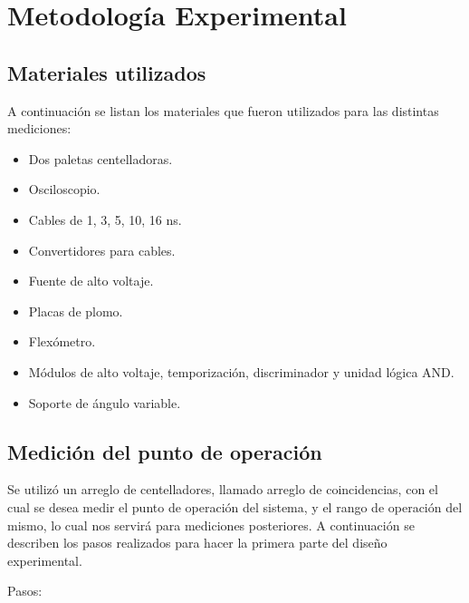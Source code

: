 \documentclass[a4paper,10pt]{article}
\numberwithin{equation}{section}
\begin{document}
\newpage

\section{Metodología Experimental}
\label{s:metodologiaexperimental}

\subsection{Materiales utilizados}
\label{ss:materialesutilizados}

A continuación se listan los materiales que fueron utilizados para las distintas mediciones:

\begin{itemize}
 \item Dos paletas centelladoras.
 \item Osciloscopio.
 \item Cables de 1, 3, 5, 10, 16 ns.
 \item Convertidores para cables.
 \item Fuente de alto voltaje.
 \item Placas de plomo.
 \item Flexómetro.
 \item Módulos de alto voltaje, temporización, discriminador y unidad lógica AND.
 \item Soporte de ángulo variable.
\end{itemize}


\subsection{Medición del punto de operación}
\label{ss:medicionoperacion}

Se utilizó un arreglo de centelladores, llamado arreglo de coincidencias, con el cual se desea medir el punto de operación del sistema, y el rango de operación del mismo, 
lo cual nos servirá para mediciones posteriores. A continuación se describen los 
pasos realizados para hacer la primera parte del diseño experimental.

\vspace{.3cm}

Pasos:
\end{document}
